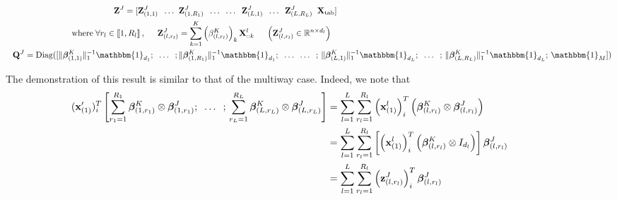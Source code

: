 \documentclass[preprint,12pt]{elsarticle}
\begin{document}
\begin{align}
    \mathbf{Z}^J = [ \mathbf{Z}_{(1,1)}^J \; \; \hdots \; \;                                                        & \mathbf{Z}_{(1,R_1)}^J  \; \; \hdots  \; \; \hdots \; \; \mathbf{Z}_{(L,1)}^J \; \; \hdots \; \; \mathbf{Z}_{(L,R_L)}^J \; \; \mathbf{X}_{\text{tab}}] \label{eqref: Z_j}                                                                                                                      \\
    \text{where} \; \forall r_l \in \llbracket 1, R_l\rrbracket\, , \hspace{0.5 cm} \mathbf{Z}_{(l,r_l)}^J                & = \sum\limits_{k = 1}^K \left(\beta_{(l,r_l)}^K\right)_k\mathbf{X}^l_{::k}  \hspace{0.5 cm} \left(\mathbf{Z}_{(l,r_l)}^J \in \mathbb{R}^{n \times d_l}\right) \label{eqref: Z_r}                                                                                                               \\
    \hspace{7 pt}
    \mathbf{Q}^J = \text{Diag}([\lVert \bm{\beta}_{(1,1)}^K \rVert_1^{-1} \mathbbm{1}_{d_1}; \; \; \hdots \; \;; \, & \lVert \bm{\beta}_{(1,R_1)}^K \rVert_1^{-1} \mathbbm{1}_{d_1};  \; \; \hdots \; \;  \hdots \; \; ;\, \lVert \bm{\beta}_{(L,1)}^K \rVert_1^{-1} \mathbbm{1}_{d_L};  \; \;  \hdots \; \; ;\, \lVert \bm{\beta}_{(L,R_L)}^K \rVert_1^{-1} \mathbbm{1}_{d_L}; \, \mathbbm{1}_M]) \label{eqref:Q^J}
\end{align}

The demonstration of this result is similar to that of the multiway case. Indeed, we note that
\begin{align}
    \hspace{-40 pt}(\mathbf{x}_{(1)}')_i^T \left[ \sum\limits_{r_1 = 1}^{R_1} \bm{\beta}_{(1,r_1)}^K \otimes \bm{\beta}_{(1,r_1)}^J;   \; \; \hdots  \; \; ;\, \sum\limits_{r_L = 1}^{R_L} \bm{\beta}_{(L,r_L)}^K \otimes \bm{\beta}_{(L,r_L)}^J \right] & = \sum\limits_{l = 1}^L \sum\limits_{r_l = 1}^{R_l} \left(\mathbf{x}_{(1)}^l\right)_i^T \left(\bm{\beta}_{(l,r_l)}^K \otimes \bm{\beta}_{(l,r_l)}^J \right)                        \\
                                                                                                                                                                                                                                     & = \sum\limits_{l = 1}^L \sum\limits_{r_l = 1}^{R_l} \left[ \left(\mathbf{x}_{(1)}^l\right)_i^T \left( \bm{\beta}_{(l,r_l)}^K \otimes I_{d_l} \right) \right]\bm{\beta}_{(l,r_l)}^J \\
                                                                                                                                                                                                                                     & = \sum\limits_{l = 1}^L \sum\limits_{r_l = 1}^{R_l}\left(\mathbf{z}_{(l,r_l)}^J\right)_i^T \bm{\beta}_{(l,r_l)}^J
\end{align}
\end{document}
